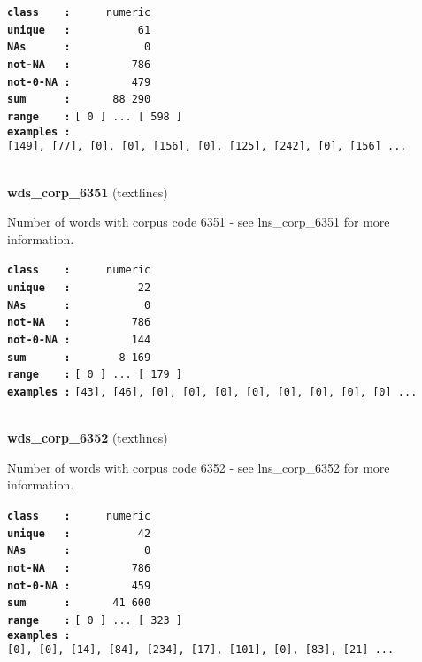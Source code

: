 \documentclass[]{article}
\begin{document}
\textbf{\texttt{class\ \ \ \ :}} \texttt{~~~~~numeric}\\
\textbf{\texttt{unique\ \ \ :}} \texttt{~~~~~~~~~~61}\\
\textbf{\texttt{NAs\ \ \ \ \ \ :}} \texttt{~~~~~~~~~~~0}\\
\textbf{\texttt{not-NA\ \ \ :}} \texttt{~~~~~~~~~786}\\
\textbf{\texttt{not-0-NA\ :}} \texttt{~~~~~~~~~479}\\
\textbf{\texttt{sum\ \ \ \ \ \ :}} \texttt{~~~~~~88~290}\\
\textbf{\texttt{range\ \ \ \ :}}
\texttt{{[}\ 0\ {]}\ ...\ {[}\ 598\ {]}}\\
\textbf{\texttt{examples\ :}}
\texttt{{[}149{]},\ {[}77{]},\ {[}0{]},\ {[}0{]},\ {[}156{]},\ {[}0{]},\ {[}125{]},\ {[}242{]},\ {[}0{]},\ {[}156{]}\ ...}\\

~

\textbf{wds\_corp\_6351} (textlines)

Number of words with corpus code 6351 - see lns\_corp\_6351 for more
information.

\textbf{\texttt{class\ \ \ \ :}} \texttt{~~~~~numeric}\\
\textbf{\texttt{unique\ \ \ :}} \texttt{~~~~~~~~~~22}\\
\textbf{\texttt{NAs\ \ \ \ \ \ :}} \texttt{~~~~~~~~~~~0}\\
\textbf{\texttt{not-NA\ \ \ :}} \texttt{~~~~~~~~~786}\\
\textbf{\texttt{not-0-NA\ :}} \texttt{~~~~~~~~~144}\\
\textbf{\texttt{sum\ \ \ \ \ \ :}} \texttt{~~~~~~~8~169}\\
\textbf{\texttt{range\ \ \ \ :}}
\texttt{{[}\ 0\ {]}\ ...\ {[}\ 179\ {]}}\\
\textbf{\texttt{examples\ :}}
\texttt{{[}43{]},\ {[}46{]},\ {[}0{]},\ {[}0{]},\ {[}0{]},\ {[}0{]},\ {[}0{]},\ {[}0{]},\ {[}0{]},\ {[}0{]}\ ...}\\

~

\textbf{wds\_corp\_6352} (textlines)

Number of words with corpus code 6352 - see lns\_corp\_6352 for more
information.

\textbf{\texttt{class\ \ \ \ :}} \texttt{~~~~~numeric}\\
\textbf{\texttt{unique\ \ \ :}} \texttt{~~~~~~~~~~42}\\
\textbf{\texttt{NAs\ \ \ \ \ \ :}} \texttt{~~~~~~~~~~~0}\\
\textbf{\texttt{not-NA\ \ \ :}} \texttt{~~~~~~~~~786}\\
\textbf{\texttt{not-0-NA\ :}} \texttt{~~~~~~~~~459}\\
\textbf{\texttt{sum\ \ \ \ \ \ :}} \texttt{~~~~~~41~600}\\
\textbf{\texttt{range\ \ \ \ :}}
\texttt{{[}\ 0\ {]}\ ...\ {[}\ 323\ {]}}\\
\textbf{\texttt{examples\ :}}
\texttt{{[}0{]},\ {[}0{]},\ {[}14{]},\ {[}84{]},\ {[}234{]},\ {[}17{]},\ {[}101{]},\ {[}0{]},\ {[}83{]},\ {[}21{]}\ ...}\\
\end{document}
